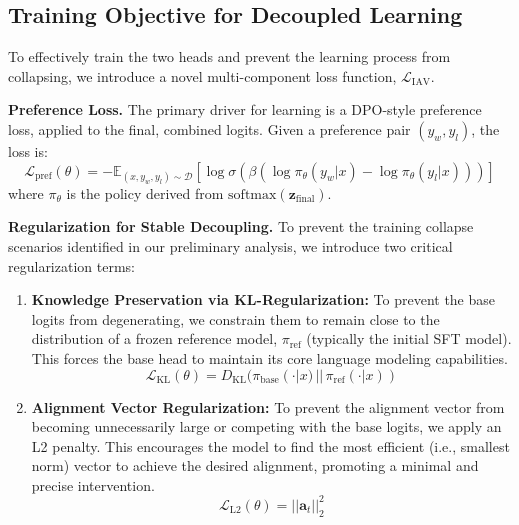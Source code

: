 \documentclass{article}
\begin{document}
\subsection{Training Objective for Decoupled Learning}

To effectively train the two heads and prevent the learning process from collapsing, we introduce a novel multi-component loss function, $\mathcal{L}_{\text{IAV}}$.

\textbf{Preference Loss.} The primary driver for learning is a DPO-style preference loss, applied to the final, combined logits. Given a preference pair $(y_w, y_l)$, the loss is:
\begin{equation}
\mathcal{L}_{\text{pref}}(\theta) = -\mathbb{E}_{(x, y_w, y_l) \sim \mathcal{D}} \left[ \log \sigma \left( \beta \left( \log \pi_{\theta}(y_w|x) - \log \pi_{\theta}(y_l|x) \right) \right) \right]
\end{equation}
where $\pi_{\theta}$ is the policy derived from $\text{softmax}(\mathbf{z}_{\text{final}})$.

\textbf{Regularization for Stable Decoupling.} To prevent the training collapse scenarios identified in our preliminary analysis, we introduce two critical regularization terms:

\begin{enumerate}
    \item \textbf{Knowledge Preservation via KL-Regularization:} To prevent the base logits from degenerating, we constrain them to remain close to the distribution of a frozen reference model, $\pi_{\text{ref}}$ (typically the initial SFT model). This forces the base head to maintain its core language modeling capabilities.
    \begin{equation}
    \mathcal{L}_{\text{KL}}(\theta) = D_{\text{KL}}(\pi_{\text{base}}(\cdot|x) \,||\, \pi_{\text{ref}}(\cdot|x))
    \end{equation}
    \item \textbf{Alignment Vector Regularization:} To prevent the alignment vector from becoming unnecessarily large or competing with the base logits, we apply an L2 penalty. This encourages the model to find the most efficient (i.e., smallest norm) vector to achieve the desired alignment, promoting a minimal and precise intervention.
    \begin{equation}
    \mathcal{L}_{\text{L2}}(\theta) = ||\mathbf{a}_t||_2^2
    \end{equation}
\end{enumerate}
\end{document}
